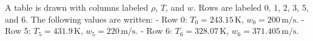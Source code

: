 A table is drawn with columns labeled \( \rho \), \( T \), and \( w \). Rows are labeled 0, 1, 2, 3, 5, and 6. The following values are written:  
- Row 0: \( T_0 = 243.15 \, \text{K} \), \( w_0 = 200 \, \text{m/s} \).  
- Row 5: \( T_5 = 431.9 \, \text{K} \), \( w_5 = 220 \, \text{m/s} \).  
- Row 6: \( T_6 = 328.07 \, \text{K} \), \( w_6 = 371.405 \, \text{m/s} \).